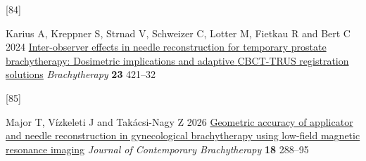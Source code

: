 \documentclass[
  11pt,
]{article}
\newlength{\cslhangindent}
\newlength{\csllabelwidth}
\newenvironment{CSLReferences}[2] %
 {\begin{list}{}{%
  \setlength{\itemindent}{0pt}
  \setlength{\leftmargin}{0pt}
  \setlength{\parsep}{0pt}
  \ifodd #1
   \setlength{\leftmargin}{\cslhangindent}
   \setlength{\itemindent}{-1\cslhangindent}
  \fi
  \setlength{\itemsep}{#2\baselineskip}}}
 {\end{list}}
\newcommand{\CSLLeftMargin}[1]{\parbox[t]{\csllabelwidth}{\strut#1\strut}}
\newcommand{\CSLRightInline}[1]{\parbox[t]{\linewidth - \csllabelwidth}{\strut#1\strut}}
\begin{document}
\begin{CSLReferences}{0}{1}
\CSLLeftMargin{{[}84{]} }%
\CSLRightInline{Karius A, Kreppner S, Strnad V, Schweizer C, Lotter M,
Fietkau R and Bert C 2024
\href{https://doi.org/10.1016/j.brachy.2024.05.002}{Inter-observer
effects in needle reconstruction for temporary prostate brachytherapy:
Dosimetric implications and adaptive {CBCT-TRUS} registration solutions}
\emph{Brachytherapy} \textbf{23} 421--32}

\CSLLeftMargin{{[}85{]} }%
\CSLRightInline{Major T, Vízkeleti J and Takácsi-Nagy Z 2026
\href{https://doi.org/10.5114/jcb.2026.164049}{Geometric accuracy of
applicator and needle reconstruction in gynecological brachytherapy
using low-field magnetic resonance imaging} \emph{Journal of
Contemporary Brachytherapy} \textbf{18} 288--95}

\end{CSLReferences}
\end{document}
